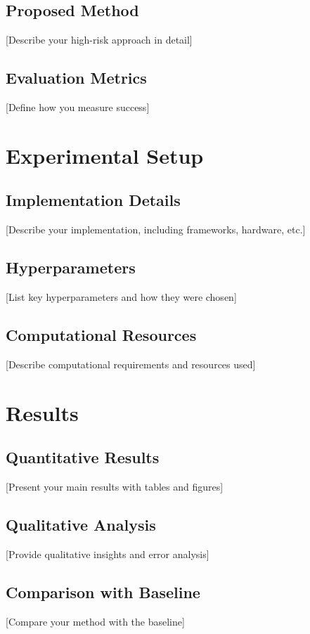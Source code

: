 \documentclass[sigconf]{acmart}
\begin{document}
\subsection{Proposed Method}
[Describe your high-risk approach in detail]

\subsection{Evaluation Metrics}
[Define how you measure success]

\section{Experimental Setup}
\label{sec:experimental_setup}

\subsection{Implementation Details}
[Describe your implementation, including frameworks, hardware, etc.]

\subsection{Hyperparameters}
[List key hyperparameters and how they were chosen]

\subsection{Computational Resources}
[Describe computational requirements and resources used]

\section{Results}
\label{sec:results}

\subsection{Quantitative Results}
[Present your main results with tables and figures]

\subsection{Qualitative Analysis}
[Provide qualitative insights and error analysis]

\subsection{Comparison with Baseline}
[Compare your method with the baseline]
\end{document}

